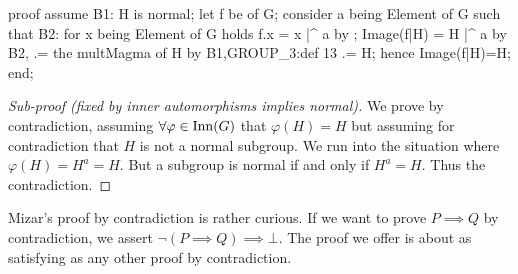 \nwenddocs{}\endmoddef\nwstartdeflinemarkup{}\nwenddeflinemarkup
proof
  assume B1: H is normal;
  let f be   of G;
  consider a being Element of G such that
  B2: for x being Element of G holds f.x = x |^ a
  by ;
  Image(f|H) = H |^ a by B2,
            .= the multMagma of H by B1,GROUP_3:def 13
            .= H;
  hence Image(f|H)=H;
end;
\nwendcode{}\nwdocspar

\begin{proof}[Sub-proof (fixed by inner automorphisms implies normal)]
We prove by contradiction, assuming $\forall\varphi\in\operatorname{Inn}(G)$ that $\varphi(H)=H$
but assuming for contradiction that $H$ is not a normal subgroup. We run
into the situation where $\varphi(H) = H^{a} = H$. But a subgroup is
normal if and only if $H^{a}=H$. Thus the contradiction.
\end{proof}

\begin{thm-remark}
Mizar's proof by contradiction is rather curious. If we want to prove
$P\implies Q$ by contradiction, we assert $\neg(P\implies
Q)\implies\bot$. The proof we offer is about as satisfying as any other
proof by contradiction.
\end{thm-remark}

